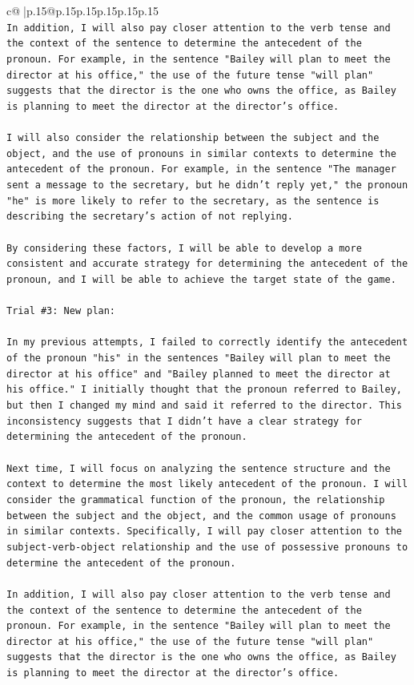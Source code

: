\documentclass{article}
\begin{document}
{\begin{supertabular}{c@{$\;$}|p{.15\linewidth}@{}p{.15\linewidth}p{.15\linewidth}p{.15\linewidth}p{.15\linewidth}p{.15\linewidth}}
{{{\\ 
\texttt{In addition, I will also pay closer attention to the verb tense and the context of the sentence to determine the antecedent of the pronoun. For example, in the sentence "Bailey will plan to meet the director at his office," the use of the future tense "will plan" suggests that the director is the one who owns the office, as Bailey is planning to meet the director at the director's office.} \\
\\ 
\texttt{I will also consider the relationship between the subject and the object, and the use of pronouns in similar contexts to determine the antecedent of the pronoun. For example, in the sentence "The manager sent a message to the secretary, but he didn't reply yet," the pronoun "he" is more likely to refer to the secretary, as the sentence is describing the secretary's action of not replying.} \\
\\ 
\texttt{By considering these factors, I will be able to develop a more consistent and accurate strategy for determining the antecedent of the pronoun, and I will be able to achieve the target state of the game.} \\
\\ 
\texttt{Trial \#3: New plan: } \\
\\ 
\texttt{In my previous attempts, I failed to correctly identify the antecedent of the pronoun "his" in the sentences "Bailey will plan to meet the director at his office" and "Bailey planned to meet the director at his office." I initially thought that the pronoun referred to Bailey, but then I changed my mind and said it referred to the director. This inconsistency suggests that I didn't have a clear strategy for determining the antecedent of the pronoun.} \\
\\ 
\texttt{Next time, I will focus on analyzing the sentence structure and the context to determine the most likely antecedent of the pronoun. I will consider the grammatical function of the pronoun, the relationship between the subject and the object, and the common usage of pronouns in similar contexts. Specifically, I will pay closer attention to the subject{-}verb{-}object relationship and the use of possessive pronouns to determine the antecedent of the pronoun.} \\
\\ 
\texttt{In addition, I will also pay closer attention to the verb tense and the context of the sentence to determine the antecedent of the pronoun. For example, in the sentence "Bailey will plan to meet the director at his office," the use of the future tense "will plan" suggests that the director is the one who owns the office, as Bailey is planning to meet the director at the director's office.} \\
}}}
\end{supertabular}}
\end{document}
